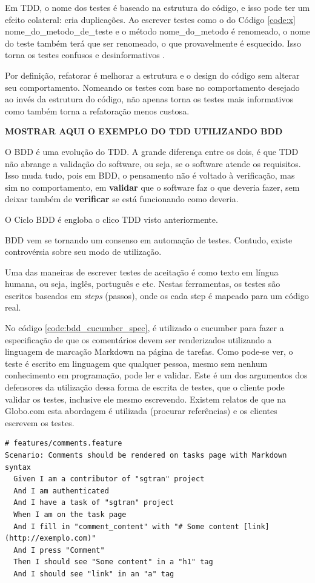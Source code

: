 Em TDD, o nome dos testes é baseado na estrutura do código, e isso pode ter um efeito colateral: cria duplicações. Ao escrever testes como o do Código \ref{code:x} nome\_do\_metodo\_de\_teste e o método nome\_do\_metodo é renomeado, o nome do teste também terá que ser renomeado, o que provavelmente é esquecido. Isso torna os testes confusos e desinformativos \cite{ContinuousTesting}.

Por definição, refatorar é melhorar a estrutura e o design do código sem alterar seu comportamento. Nomeando os testes com base no comportamento desejado ao invés da estrutura do código, não apenas torna os testes mais informativos como também torna a refatoração menos custosa.

\textbf{MOSTRAR AQUI O EXEMPLO DO TDD UTILIZANDO BDD}

O BDD é uma evolução do TDD. A grande diferença entre os dois, é que TDD não abrange a validação do software, ou seja, se o software atende os requisitos. Isso muda tudo, pois em BDD, o pensamento não é voltado à verificação, mas sim no comportamento, em \textbf{validar} que o software faz o que deveria fazer, sem deixar também de \textbf{verificar} se está funcionando como deveria.

O Ciclo BDD é engloba o clico TDD visto anteriormente.

BDD vem se tornando um consenso em automação de testes. Contudo, existe controvérsia sobre seu modo de utilização.

Uma das maneiras de escrever testes de aceitação é como texto em língua humana,
ou seja, inglês, português e etc. Nestas ferramentas, os testes são escritos baseados em \textit{steps} (passos), onde os cada step é mapeado para um código real.

No código \ref{code:bdd_cucumber_spec}, é utilizado o cucumber para fazer a especificação de que os comentários devem ser renderizados utilizando a linguagem de marcação Markdown na página de tarefas. Como pode-se ver, o teste é escrito em linguagem que qualquer pessoa, mesmo sem nenhum conhecimento em programação, pode ler e validar. Este é um dos argumentos dos defensores da utilização dessa forma de escrita de testes, que o cliente pode validar os testes, inclusive ele mesmo escrevendo. Existem relatos de que na Globo.com esta abordagem é utilizada (procurar referências) e os clientes escrevem os testes.

\begin{lstlisting}[caption=Especificação ,label=code:bdd_cucumber_spec]
# features/comments.feature
Scenario: Comments should be rendered on tasks page with Markdown syntax
  Given I am a contributor of "sgtran" project
  And I am authenticated
  And I have a task of "sgtran" project
  When I am on the task page
  And I fill in "comment_content" with "# Some content [link](http://exemplo.com)"
  And I press "Comment"
  Then I should see "Some content" in a "h1" tag
  And I should see "link" in an "a" tag
\end{lstlisting}


